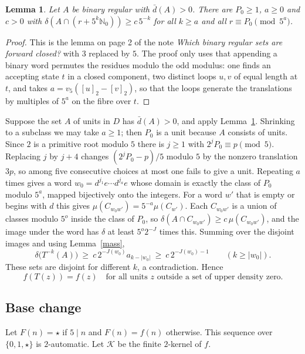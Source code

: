 \documentclass[11pt]{article}
\newtheorem{lemma}[theorem]{Lemma}
\theoremstyle{remark}
\newcommand{\N}{\mathbb{N}_0}
\newcommand{\ud}{\bar d}
\newcommand{\ld}{\delta}
\begin{document}
\begin{lemma}\label{equi}
Let $A$ be binary regular with $\ud(A)>0$. There are $P_0\ge1$, $a\ge0$ and
$c>0$ with $\ld(A\cap(r+5^k\N))\ge c\,5^{-k}$ for all $k\ge a$ and all
$r\equiv P_0\pmod{5^a}$.
\end{lemma}
\begin{proof}
This is the lemma on page 2 of the note \emph{Which binary regular sets are
forward closed?} with $3$ replaced by $5$. The proof only uses that appending a
binary word permutes the residues modulo the odd modulus: one finds an
accepting state $t$ in a closed component, two distinct loops $u,v$ of equal
length at $t$, and takes $a=v_5([u]_2-[v]_2)$, so that the loops generate the
translations by multiples of $5^a$ on the fibre over $t$.
\end{proof}

Suppose the set $A$ of units in $D$ has $\ud(A)>0$, and apply Lemma~\ref{equi}.
Shrinking to a subclass we may take $a\ge1$; then $P_0$ is a unit because $A$
consists of units. Since $2$ is a primitive root modulo $5$ there is $j\ge1$
with $2^jP_0\equiv p\pmod5$. Replacing $j$ by $j+4$ changes $(2^jP_0-p)/5$
modulo $5$ by the nonzero translation $3p$, so among five consecutive choices
at most one fails to give a unit. Repeating $a$ times gives a word
$w_0=d^{j_1}e\cdots d^{j_a}e$ whose domain is exactly the class of $P_0$ modulo
$5^a$, mapped bijectively onto the integers. For a word $w'$ that is empty or
begins with $d$ this gives $\mu(C_{w_0w'})=5^{-a}\mu(C_{w'})$. Each $C_{w_0w'}$
is a union of classes modulo $5^{o}$ inside the class of $P_0$, so
$\ld(A\cap C_{w_0w'})\ge c\,\mu(C_{w_0w'})$, and the image under the word has
$\ld$ at least $5^{o}2^{-J}$ times this. Summing over the disjoint images and
using Lemma~\ref{mass},
\[
\ld\bigl(T^{-k}(A)\bigr)\ \ge\ c\,2^{-J(w_0)}a_{k-|w_0|}\ \ge\ c\,2^{-J(w_0)-1}
\qquad(k\ge|w_0|).
\]
These sets are disjoint for different $k$, a contradiction. Hence
\begin{equation}\label{inv}
f(T(z))=f(z)\quad\text{for all units } z \text{ outside a set of upper density zero.}
\end{equation}

\subsection{Base change}

Let $F(n)=\star$ if $5\mid n$ and $F(n)=f(n)$ otherwise. This sequence over
$\{0,1,\star\}$ is $2$-automatic. Let $\mathcal K$ be the finite $2$-kernel of
$f$.
\end{document}
